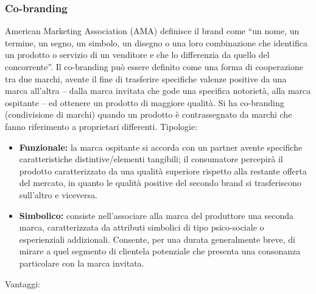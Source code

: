 \subsubsection{Co-branding}
American Marketing Association (AMA) definisce il brand come “un nome, un termine, un segno, un simbolo, un disegno o una loro combinazione che identifica un prodotto o servizio di un venditore e che lo differenzia da quello del concorrente”. Il co-branding può essere definito come una forma di cooperazione tra due marchi, avente il fine di trasferire specifiche valenze positive da una marca all’altra – dalla marca invitata che gode una specifica notorietà, alla marca ospitante – ed ottenere un prodotto di maggiore qualità. Si ha co-branding (condivisione di marchi) quando un prodotto è contrassegnato da marchi che fanno riferimento a proprietari differenti. \newline
Tipologie:
\begin{itemize}
	\item \textbf{Funzionale:} la marca ospitante si accorda con un partner avente specifiche caratteristiche distintive/elementi tangibili; il consumatore percepirà il prodotto caratterizzato da una qualità superiore rispetto alla restante offerta del mercato, in quanto le qualità positive del secondo brand si trasferiscono sull’altro e viceversa.
	\item \textbf{Simbolico:} consiste nell’associare alla marca del produttore una seconda marca, caratterizzata da attributi simbolici di tipo psico-sociale o esperienziali addizionali. Consente, per una durata generalmente breve, di mirare a quel segmento di clientela potenziale che presenta una consonanza particolare con la marca invitata.
\end{itemize}
Vantaggi:
